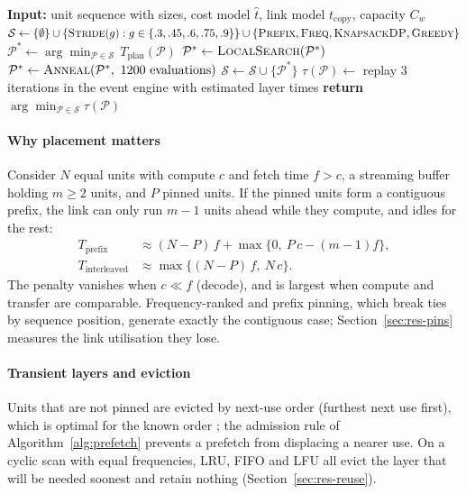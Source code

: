 \documentclass[preprint,12pt]{elsarticle}
\begin{document}
\begin{algorithm}[t]
\caption{Stall-cost-aware pinning (SCP)}
\label{alg:scp}
\begin{algorithmic}[1]
\State \textbf{Input:} unit sequence with sizes, cost model $\hat t$, link model $t_{\mathrm{copy}}$, capacity $C_w$
\State $\mathcal S \gets \{\emptyset\}\cup\{\textsc{Stride}(g): g\in\{.3,.45,.6,.75,.9\}\}\cup\{\textsc{Prefix},\textsc{Freq},\textsc{KnapsackDP},\textsc{Greedy}\}$ 
\State $\mathcal P^\ast \gets \arg\min_{\mathcal P\in\mathcal S}\, T_{\mathrm{plan}}(\mathcal P)$
\State $\mathcal P^\ast \gets \textsc{LocalSearch}(\mathcal P^\ast)$ 
\State $\mathcal P^\ast \gets \textsc{Anneal}(\mathcal P^\ast,\ 1200\text{ evaluations})$
\State $\mathcal S \gets \mathcal S\cup\{\mathcal P^\ast\}$
  \State $\tau(\mathcal P) \gets$ replay 3 iterations in the event engine with estimated layer times
\EndFor
\State \textbf{return} $\arg\min_{\mathcal P\in\mathcal S}\tau(\mathcal P)$
\end{algorithmic}
\end{algorithm}

\paragraph{Why placement matters}
Consider $N$ equal units with compute $c$ and fetch time $f>c$, a streaming buffer holding $m\ge 2$ units, and $P$ pinned units. If the pinned units form a contiguous prefix, the link can only run $m-1$ units ahead while they compute, and idles for the rest:
\begin{align}
T_{\mathrm{prefix}}&\approx (N-P)\,f + \max\{0,\ P\,c-(m-1)f\},\nonumber\\
T_{\mathrm{interleaved}}&\approx \max\{(N-P)\,f,\ N\,c\}.
\label{eq:placement}
\end{align}
The penalty vanishes when $c\ll f$ (decode), and is largest when compute and transfer are comparable. Frequency-ranked and prefix pinning, which break ties by sequence position, generate exactly the contiguous case; Section~\ref{sec:res-pins} measures the link utilisation they lose.

\paragraph{Transient layers and eviction}
Units that are not pinned are evicted by next-use order (furthest next use first), which is optimal for the known order \cite{belady1966study}; the admission rule of Algorithm~\ref{alg:prefetch} prevents a prefetch from displacing a nearer use. On a cyclic scan with equal frequencies, LRU, FIFO and LFU all evict the layer that will be needed soonest and retain nothing (Section~\ref{sec:res-reuse}).
\end{document}
